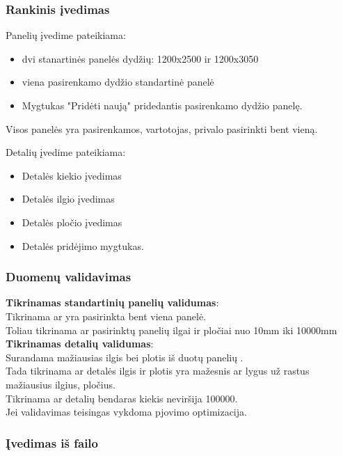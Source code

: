 \documentclass[a4paper,12pt]{article}
\begin{document}
\subsubsection{Rankinis įvedimas}

Panelių įvedime pateikiama:
\begin{itemize}
	\item dvi stanartinės panelės dydžių: 1200x2500 ir 1200x3050
	\item viena pasirenkamo dydžio standartinė panelė
	\item Mygtukas "Pridėti naują" pridedantis pasirenkamo dydžio panelę. 
\end{itemize} 
Visos panelės yra pasirenkamos, vartotojas, privalo pasirinkti bent vieną.

Detalių įvedime pateikiama:
\begin{itemize}
	\item Detalės kiekio įvedimas
	\item Detalės ilgio įvedimas
	\item Detalės pločio įvedimas
	\item Detalės pridėjimo mygtukas.
\end{itemize}

\subsubsection{Duomenų validavimas}
\textbf{Tikrinamas standartinių panelių validumas}:\\
	Tikrinama ar yra pasirinkta bent viena panelė. \\
	Toliau tikrinama ar pasirinktų panelių ilgai ir pločiai nuo 10mm iki 10000mm \\


\textbf{Tikrinamas detalių validumas}:\\
	Surandama mažiausias ilgis bei plotis iš duotų panelių .\\
	Tada tikrinama ar detalės ilgis ir plotis yra mažesnis ar lygus už rastus mažiausius ilgius, pločius.\\
	Tikrinama ar detalių bendaras kiekis neviršija 100000. \\

Jei validavimas teisingas vykdoma pjovimo optimizacija.


\subsubsection{Įvedimas iš failo}
\end{document}
